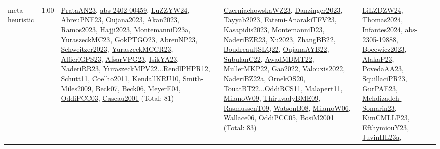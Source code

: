 {\begin{longtable}{p{3cm}r>{\raggedright\arraybackslash}p{6cm}>{\raggedright\arraybackslash}p{6cm}>{\raggedright\arraybackslash}p{8cm}}
\index{meta heuristic}\index{Algorithms!meta heuristic}meta heuristic &  1.00 & \hyperref[detail:PrataAN23]{PrataAN23}, \hyperref[detail:abs-2402-00459]{abs-2402-00459}, \hyperref[detail:LuZZYW24]{LuZZYW24}, \hyperref[detail:AbreuPNF23]{AbreuPNF23}, \hyperref[detail:Oujana2023]{Oujana2023}, \hyperref[detail:Akan2023]{Akan2023}, \hyperref[detail:Ramos2023]{Ramos2023}, \hyperref[detail:Hajji2023]{Hajji2023}, \hyperref[detail:MontemanniD23a]{MontemanniD23a}, \hyperref[detail:YuraszeckMC23]{YuraszeckMC23}, \hyperref[detail:GokPTGO23]{GokPTGO23}, \hyperref[detail:AbreuNP23]{AbreuNP23}, \hyperref[detail:Schweitzer2023]{Schweitzer2023}, \hyperref[detail:YuraszeckMCCR23]{YuraszeckMCCR23}, \hyperref[detail:AlfieriGPS23]{AlfieriGPS23}, \hyperref[detail:AfsarVPG23]{AfsarVPG23}, \hyperref[detail:IsikYA23]{IsikYA23}, \hyperref[detail:NaderiRR23]{NaderiRR23}, \hyperref[detail:YuraszeckMPV22]{YuraszeckMPV22}...\hyperref[detail:RendlPHPR12]{RendlPHPR12}, \hyperref[detail:Schutt11]{Schutt11}, \hyperref[detail:Coelho2011]{Coelho2011}, \hyperref[detail:KendallKRU10]{KendallKRU10}, \hyperref[detail:Smith-Miles2009]{Smith-Miles2009}, \hyperref[detail:Beck07]{Beck07}, \hyperref[detail:Beck06]{Beck06}, \hyperref[detail:MeyerE04]{MeyerE04}, \hyperref[detail:OddiPCC03]{OddiPCC03}, \hyperref[detail:Caseau2001]{Caseau2001} (Total: 81) & \hyperref[detail:CzerniachowskaWZ23]{CzerniachowskaWZ23}, \hyperref[detail:Danzinger2023]{Danzinger2023}, \hyperref[detail:Tayyab2023]{Tayyab2023}, \hyperref[detail:Fatemi-AnarakiTFV23]{Fatemi-AnarakiTFV23}, \hyperref[detail:Kasapidis2023]{Kasapidis2023}, \hyperref[detail:MontemanniD23]{MontemanniD23}, \hyperref[detail:NaderiBZR23]{NaderiBZR23}, \hyperref[detail:Xu2023]{Xu2023}, \hyperref[detail:ZhangBB22]{ZhangBB22}, \hyperref[detail:BoudreaultSLQ22]{BoudreaultSLQ22}, \hyperref[detail:OujanaAYB22]{OujanaAYB22}, \hyperref[detail:SubulanC22]{SubulanC22}, \hyperref[detail:AwadMDMT22]{AwadMDMT22}, \hyperref[detail:MullerMKP22]{MullerMKP22}, \hyperref[detail:Gao2022]{Gao2022}, \hyperref[detail:Valouxis2022]{Valouxis2022}, \hyperref[detail:NaderiBZ22a]{NaderiBZ22a}, \hyperref[detail:OrnekOS20]{OrnekOS20}, \hyperref[detail:TouatBT22]{TouatBT22}...\hyperref[detail:OddiRCS11]{OddiRCS11}, \hyperref[detail:Malapert11]{Malapert11}, \hyperref[detail:MilanoW09]{MilanoW09}, \hyperref[detail:ThiruvadyBME09]{ThiruvadyBME09}, \hyperref[detail:RasmussenT09]{RasmussenT09}, \hyperref[detail:WatsonB08]{WatsonB08}, \hyperref[detail:MilanoW06]{MilanoW06}, \hyperref[detail:Wallace06]{Wallace06}, \hyperref[detail:OddiPCC05]{OddiPCC05}, \hyperref[detail:BosiM2001]{BosiM2001} (Total: 83) & \hyperref[detail:LiLZDZW24]{LiLZDZW24}, \hyperref[detail:Thomas2024]{Thomas2024}, \hyperref[detail:Infantes2024]{Infantes2024}, \hyperref[detail:abs-2305-19888]{abs-2305-19888}, \hyperref[detail:Bocewicz2023]{Bocewicz2023}, \hyperref[detail:AlakaP23]{AlakaP23}, \hyperref[detail:PovedaAA23]{PovedaAA23}, \hyperref[detail:SquillaciPR23]{SquillaciPR23}, \hyperref[detail:GurPAE23]{GurPAE23}, \hyperref[detail:Mehdizadeh-Somarin23]{Mehdizadeh-Somarin23}, \hyperref[detail:KimCMLLP23]{KimCMLLP23}, \hyperref[detail:EfthymiouY23]{EfthymiouY23}, \hyperref[detail:JuvinHL23a]{JuvinHL23a}, 
\end{longtable}}
